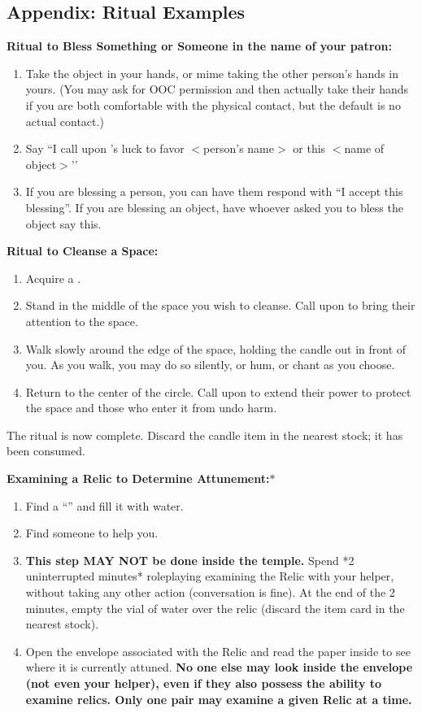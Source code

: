 \documentclass[green]{GL2020}
\begin{document}
\subsection*{Appendix: Ritual Examples}

\textbf{Ritual to Bless Something or Someone in the name of your patron:}
  \begin{enumerate}
    \item Take the object in your hands, or mime taking the other person’s hands in yours. (You may ask for OOC permission and then actually take their hands if you are both comfortable with the physical contact, but the default is no actual contact.)
    \item Say ``I call upon \cGenesis{}’s luck to favor $<$person’s name$>$ or this $<$name of object$>$’’
    \item If you are blessing a person, you can have them respond with ``I accept this blessing''. If you are blessing an object, have whoever asked you to bless the object say this.
  \end{enumerate}

\textbf{Ritual to Cleanse a Space:}
  \begin{enumerate}
    \item Acquire a \iRitualCandle{}.
    \item Stand in the middle of the space you wish to cleanse. Call upon \cGenesis{} to bring their attention to the space.
    \item Walk slowly around the edge of the space, holding the candle out in front of you. As you walk, you may do so silently, or hum, or chant as you choose.
    \item Return to the center of the circle. Call upon \cGenesis{} to extend their power to protect the space and those who enter it from undo harm.
  \end{enumerate}
The ritual is now complete. Discard the candle item in the nearest stock; it has been consumed.
   
\textbf{Examining a Relic to Determine Attunement:}$*$
  \begin{enumerate}
    \item Find a ``\iGlassVial{}'' and fill it with water.
		\item Find someone to help you.
    \item \textbf{This step MAY NOT be done inside the temple.} Spend *2 uninterrupted minutes* roleplaying examining the Relic with your helper, without taking any other action (conversation is fine). At the end of the 2 minutes, empty the vial of water over the relic (discard the item card in the nearest stock). 
    \item Open the envelope associated with the Relic and read the paper inside to see where it is currently attuned. \textbf{No one else may look inside the envelope (not even your helper), even if they also possess the ability to examine relics. Only one pair may examine a given Relic at a time.}
  \end{enumerate}
   
\end{document}
